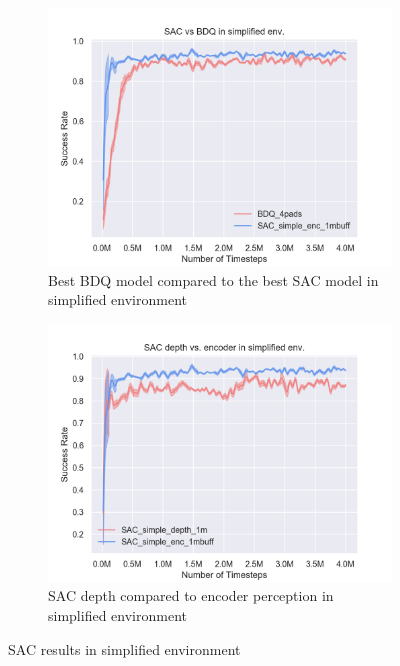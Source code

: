 \begin{figure}[!htbp]
    \begin{subfigure}{0.49\textwidth}
        \includegraphics[width=\linewidth]{figures/SAC_vs_BDQ_in_simplified_env}
        \caption{Best BDQ model compared to the best SAC model in simplified environment} \label{fig:sacvsbdq}
    \end{subfigure}%
    \hspace*{\fill}   %
    \begin{subfigure}{0.49\textwidth}
        \includegraphics[width=\linewidth]{figures/SAC_depth_vs_encoder_in_simplified_env}
        \caption{SAC depth compared to encoder perception in simplified environment} \label{fig:floor}
    \end{subfigure}%
    \hspace*{\fill}   %


\caption{ SAC results in simplified environment\label{fig:scenes}}
\end{figure}


